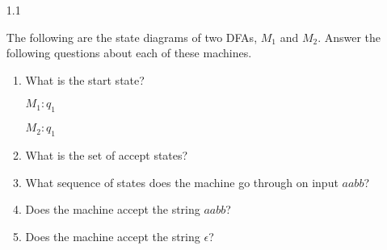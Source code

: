 \begin{enumerate}

    \item[1.1]

          The following are the state diagrams of two DFAs, $M_1$ and $M_2$. Answer the following questions about each of these machines.


          \begin{enumerate}
              \item What is the start state?

                    $M_1: q_1$

                    $M_2: q_1$

              \item What is the set of accept states?
              \item What sequence of states does the machine go through on input $aabb$?
              \item Does the machine accept the string $aabb$?
              \item Does the machine accept the string $\epsilon$?
          \end{enumerate}
\end{enumerate}
